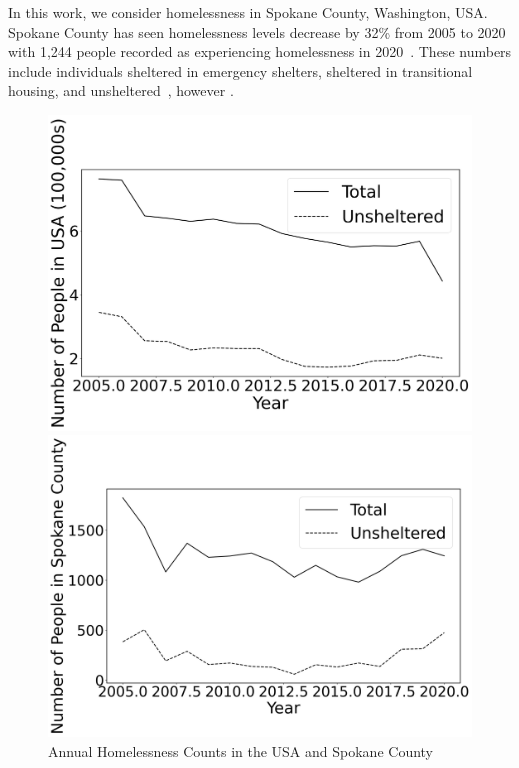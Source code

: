 \documentclass[10pt,letterpaper]{article}
\newcommand{\red}[1]{{\color{red}{#1}}}
\begin{document}
In this work, we consider homelessness in Spokane County, Washington, USA.  Spokane County has seen  homelessness levels decrease by 32\% from 2005 to 2020 with 1,244 people recorded as experiencing homelessness in 2020~\cite{PITcount}. These numbers include individuals sheltered in emergency shelters, sheltered in transitional housing, and unsheltered~\cite{PITcount}, however \red{some fear PIT counts far underestimate homeless numbers*****}.  


\iffalse
\begin{figure}[H]
    \begin{minipage}{0.5\textwidth}
        \includegraphics[width=\textwidth]{../img/homelessness_usa.png} 
    \end{minipage}
    \begin{minipage}{0.5\textwidth}
        \includegraphics[width=\textwidth]{../img/homelessness_spokane.png}
    \end{minipage}
    \caption[Annual Homelessness Counts in the USA and Spokane County]{Annual Homelessness Counts in the USA and Spokane County
    ~\cite{PITcount}   \\ \red{font size need to be far larger on axes, perhaps thicker lines in plots}    }
    \label{fig:Homeless_US_Spokane}
\end{figure}
\end{document}

